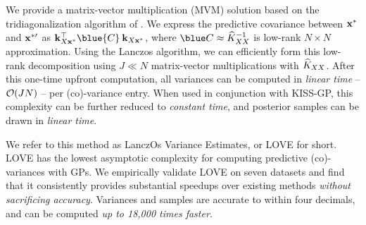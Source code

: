 We provide a matrix-vector multiplication (MVM) solution based on the tridiagonalization algorithm of \citet{lanczos1950iteration}.
We express the predictive covariance between $\mathbf{x}^*$ and $\mathbf{x}^{*\prime}$ as
$\bk_{\bX\bxtest}^\top {\blue{\bC}} \: \bk_{\bX\bxtest}$,
where $\blue \bC \approx \trainK^{-1}$ is low-rank $N \times N$ approximation.
Using the Lanczos algorithm, we can efficiently form this low-rank decomposition using $J \ll N$ matrix-vector multiplications with $\widehat{K}_{XX}$.
After this one-time upfront computation, all variances can be computed in \emph{linear time} -- $\bigo{JN}$ -- per (co)-variance entry.
When used in conjunction with KISS-GP, this complexity can be further reduced to \emph{constant time}, and posterior samples can be drawn in \emph{linear time}.

We refer to this method as LanczOs Variance Estimates, or LOVE{} for short.
LOVE{} has the lowest asymptotic complexity for computing predictive (co)-variances with GPs.
We empirically validate LOVE{} on seven datasets and find that it consistently provides substantial speedups over existing methods \emph{without sacrificing accuracy}.
Variances and samples are accurate to within four decimals, and can be computed \emph{up to 18,000 times faster.}
